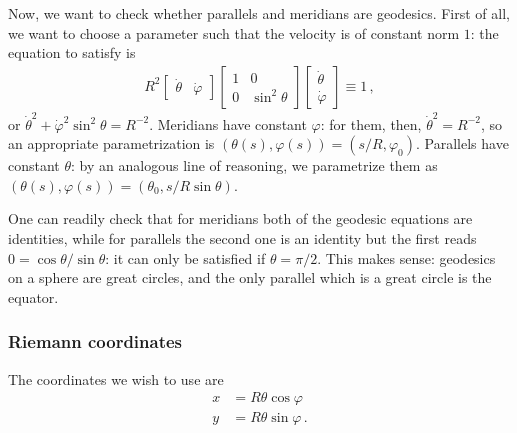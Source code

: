 \documentclass[main.tex]{subfiles}
\begin{document}
Now, we want to check whether parallels and meridians are geodesics. First of all, we want to choose a parameter such that the velocity is of constant norm \(1\): the equation to satisfy is 
%
\begin{subequations}
\begin{align}
  R^2 \left[\begin{array}{cc}
  \dot{\theta} & \dot{\varphi}
  \end{array}\right]
  \left[\begin{array}{cc}
  1 & 0 \\ 
  0 & \sin^2 \theta 
  \end{array}\right]
  \left[\begin{array}{c}
  \dot{\theta} \\ 
  \dot{\varphi}
  \end{array}\right]
  \equiv 1
\,,
\end{align}
\end{subequations}
%
or \(\dot{\theta}^2 + \dot{\varphi}^2 \sin^2 \theta = R^{-2}\).
Meridians have constant \(\varphi \): for them, then, \(\dot{\theta}^2 = R^{-2} \), so an appropriate parametrization is \((\theta(s), \varphi(s)) = (s/R, \varphi_0 )\).
Parallels have constant \(\theta \): by an analogous line of reasoning, we parametrize them as \((\theta (s), \varphi (s) )= (\theta_0, s / R \sin\theta  )\). 

One can readily check that for meridians both of the geodesic equations are identities, while for parallels the second one is an identity but the first reads \(0= \cos \theta  / \sin \theta \): it can only be satisfied if \(\theta = \pi /2\).
This makes sense: geodesics on a sphere are great circles, and the only parallel which is a great circle is the equator. 

\subsubsection{Riemann coordinates}

The coordinates we wish to use are 
%
\begin{subequations}
\begin{align}
  x &= R \theta \cos \varphi   \\
  y &= R \theta \sin \varphi 
\,.
\end{align}
\end{subequations}
%
\end{document}
